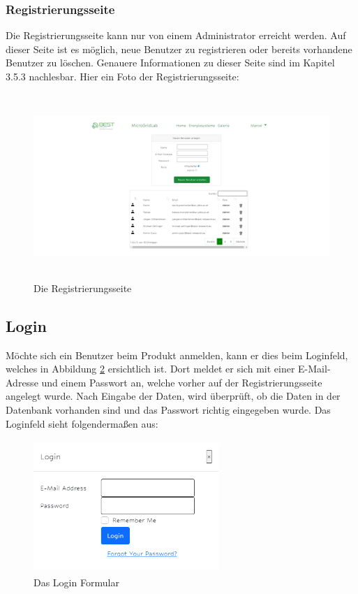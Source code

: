 \subsubsection{Registrierungsseite}
Die Registrierungsseite kann nur von einem Administrator erreicht werden. Auf dieser Seite ist es möglich, neue Benutzer zu registrieren oder bereits vorhandene Benutzer zu löschen. Genauere Informationen zu dieser Seite sind im Kapitel 3.5.3 nachlesbar. Hier ein Foto der Registrierungsseite:
\begin{figure}[h]
	\centering
	\includegraphics[height=7cm,width=14cm]{images/RegisterSeite}
	\caption{Die Registrierungsseite }
	\label{fig:RegisterSeite}
\end{figure}



\subsection{Login}
Möchte sich ein Benutzer beim Produkt anmelden, kann er dies beim Loginfeld, welches in  Abbildung \ref{fig:LoginFormular} ersichtlich ist. Dort meldet er sich mit einer E-Mail-Adresse und einem Passwort an, welche vorher auf der Registrierungsseite angelegt wurde. Nach Eingabe der Daten, wird überprüft, ob die Daten in der Datenbank vorhanden sind und das Passwort richtig eingegeben wurde. Das Loginfeld sieht folgendermaßen aus:

\begin{figure}[h]
	\centering
	\includegraphics[height=5cm,width=7cm]{images/LoginFeld}
	\caption{Das Login Formular}
	\label{fig:LoginFormular}
\end{figure}

